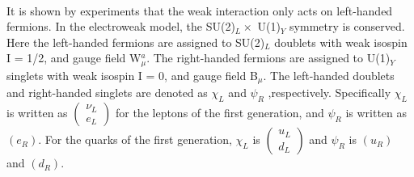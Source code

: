 \noindent\textbf{} \\
It is shown by experiments that the weak interaction only acts on left-handed fermions. In the electroweak model, the SU(2)$_L \times$ U(1)$_Y$ symmetry is conserved. Here the left-handed fermions are assigned to SU(2)$_L$ doublets with weak isospin I = 1/2, and gauge field W$^a_\mu$. The right-handed fermions are assigned to  U(1)$_Y$ singlets with weak isospin I = 0, and gauge field B$_\mu$.
The left-handed doublets and right-handed singlets are denoted as $\chi_{L}$ and $\psi_{R}$ ,respectively. Specifically $\chi_{L}$ is written as 
$
\left(\begin{array}{c}
\nu_{L} \\
e_{L}
\end{array}\right)
$
for the leptons of the first generation, and $\psi_{R}$ is written as $(e_R)$.
For the quarks of the first generation, $\chi_{L}$ is 
$
\left(\begin{array}{c}
u_{L} \\
d_{L}
\end{array}\right)
$
and $\psi_{R}$ is $(u_R)$ and $(d_R)$.




